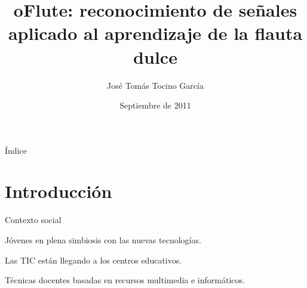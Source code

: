 \documentclass[11pt,xcolor=svgnames]{beamer}
\title{oFlute: reconocimiento de señales aplicado al aprendizaje de la flauta
  dulce}
\author{José Tomás Tocino García}
\institute[Universidad de Cádiz]{Universidad de Cádiz}
\date[Sept 2011]{Septiembre de 2011}
\begin{document}
{
  \begin{frame}
    \titlepage
  \end{frame}
}
\normalsize


\begin{frame}{Índice}
  \tableofcontents
\end{frame}


\section{Introducción}

\begin{frame}{Contexto social}
  \begin{center}
    \Large

    Jóvenes en plena simbiosis con las nuevas tecnologías.

    \bigskip
    \pause
    \bigskip

    Las TIC están llegando a los centros educativos.

    \bigskip
    \pause
    \bigskip

    Técnicas docentes basadas en recursos multimedia e informáticos.

  \end{center}
\end{frame}
\end{document}
